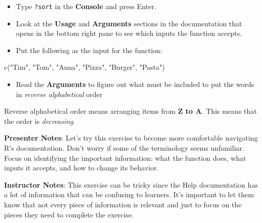 \documentclass[
  letterpaper,
  DIV=11,
  numbers=noendperiod]{scrartcl}
\newenvironment{Shaded}{\begin{snugshade}}{\end{snugshade}}
\newcommand{\NormalTok}[1]{\textcolor[rgb]{0.00,0.23,0.31}{#1}}
\providecommand{\tightlist}{%
  \setlength{\itemsep}{0pt}\setlength{\parskip}{0pt}}
\begin{document}
\begin{itemize}
\tightlist
\item[$\square$]
  Type \texttt{?sort} in the \textbf{Console} and press Enter.
\item[$\square$]
  Look at the \textbf{Usage} and \textbf{Arguments} sections in the
  documentation that opens in the bottom right pane to see which inputs
  the function accepts.
\item[$\square$]
  Put the following as the input for the function:
\end{itemize}

\begin{Shaded}
\begin{Highlighting}[]
\NormalTok{c("Tim", "Tom", "Anna", "Pizza", "Burger", "Pasta")}
\end{Highlighting}
\end{Shaded}

\begin{itemize}
\tightlist
\item[$\square$]
  Read the \textbf{Arguments} to figure out what must be included to put
  the words in \emph{reverse alphabetical} order
\end{itemize}

\begin{tcolorbox}[enhanced jigsaw, arc=.35mm, bottomrule=.15mm, bottomtitle=1mm, breakable, colback=white, colbacktitle=quarto-callout-note-color!10!white, colframe=quarto-callout-note-color-frame, coltitle=black, left=2mm, leftrule=.75mm, opacityback=0, opacitybacktitle=0.6, rightrule=.15mm, title=\textcolor{quarto-callout-note-color}{\faInfo}\hspace{0.5em}{Is reverse alphabetical order increasing or decreasing?}, titlerule=0mm, toprule=.15mm, toptitle=1mm]

Reverse alphabetical order means arranging items from \textbf{Z to A}.
This means that the order is \emph{decreasing}.

\end{tcolorbox}

\textbf{Presenter Notes}: Let's try this exercise to become more
comfortable navigating R's documentation. Don't worry if some of the
terminology seems unfamiliar. Focus on identifying the important
information: what the function does, what inputs it accepts, and how to
change its behavior.

\textbf{Instructor Notes}: This exercise can be tricky since the Help
documentation has a lot of information that can be confusing to
learners. It's important to let them know that not every piece of
information is relevant and just to focus on the pieces they need to
complete the exercise.
\end{document}
